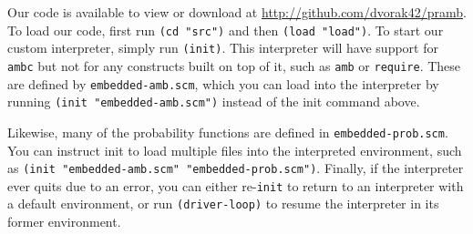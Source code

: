 \documentclass{article}
\begin{document}
Our code is available to view or download at
\url{http://github.com/dvorak42/pramb}. To load our code, first run
\texttt{(cd "src")} and then \texttt{(load "load")}. To start our
custom interpreter, simply run \texttt{(init)}. This interpreter will
have support for \texttt{ambc} but not for any constructs built on top
of it, such as \texttt{amb} or \texttt{require}. These are defined by
\texttt{embedded-amb.scm}, which you can load into the interpreter by
running \texttt{(init "embedded-amb.scm")} instead of the init command
above.

Likewise, many of the probability functions are defined in
\texttt{embedded-prob.scm}. You can instruct init to load multiple
files into the interpreted environment, such as \texttt{(init
  "embedded-amb.scm" "embedded-prob.scm")}. Finally, if the
interpreter ever quits due to an error, you can either
re-\texttt{init} to return to an interpreter with a default
environment, or run \texttt{(driver-loop)} to resume the interpreter
in its former environment.
\end{document}
